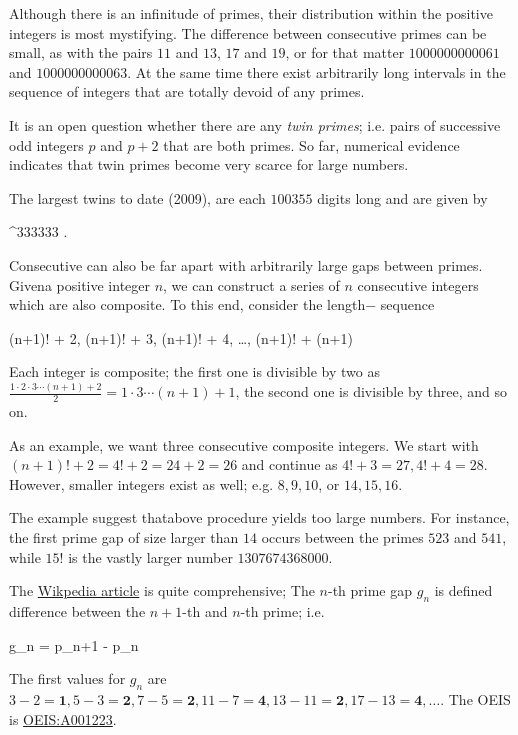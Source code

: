 
Although there is an inﬁnitude of primes, their distribution within the positive integers is most mystifying. The difference between consecutive primes can be small, as with the pairs $11$ and $13$, $17$ and $19$, or for that matter $1000000000061$ and $1000000000063$. At the same time there exist arbitrarily long intervals in the sequence of integers that are totally devoid of any primes.

It is an open question whether there are any \emph{twin primes}; i.e. pairs of successive odd integers $p$ and $p+2$ that are both primes. So far, numerical evidence indicates that twin primes become very scarce for large numbers.

The largest twins to date (2009), are each $100355$ digits long and are given by

 ^{333333}  .
\eee

Consecutive can also be far apart with arbitrarily large gaps between primes. Givena positive integer $n$, we can construct a series of $n$ consecutive integers which are also composite. To this end, consider the length$-$ sequence

\bee
(n+1)! + 2, (n+1)! + 3, (n+1)! + 4, \ldots, (n+1)! + (n+1)
\eee

Each integer is composite; the first one is divisible by two as $\frac{1 \cdot 2 \cdot 3 \cdots (n+1) + 2}{2} = 1 \cdot 3 \cdots (n+1) + 1$, the second one is divisible by three, and so on.

As an example, we want three consecutive composite integers. We start with $(n+1)! + 2 = 4! + 2 = 24+2 = 26$ and continue as $4! + 3 = 27, 4! + 4 = 28$. However, smaller integers exist as well; e.g. $8, 9, 10$, or $14, 15, 16$.

The example suggest thatabove procedure yields too large numbers. For instance, the first prime gap of size larger than $14$ occurs between the primes $523$ and $541$, while $15!$ is the vastly larger number $1307674368000$. 

The \href{https://en.wikipedia.org/wiki/Prime_gap}{Wikpedia article} is quite comprehensive; The $n$-th prime gap $g_n$ is defined difference between the $n+1$-th and $n$-th prime; i.e.

\bee
g_n = p_{n+1} - p_n
\eee

The first values for $g_n$ are $3-2 = \mathbf{1}, 5 - 3 = \mathbf{2}, 7 - 5 = \mathbf{2}, 11 - 7 = \mathbf{4}, 13 - 11 = \mathbf{2}, 17 - 13 = \mathbf{4}, \ldots$. The OEIS is \href{https://oeis.org/A001223}{OEIS:A001223}.

